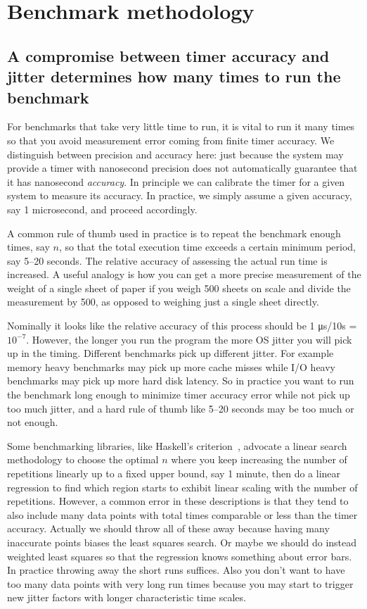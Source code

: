 \documentclass[conference]{IEEEtran}
\begin{document}
\section{Benchmark methodology}


\label{sec:linearsearch}
\subsection{A compromise between timer accuracy and jitter determines how many times to run the benchmark}

For benchmarks that take very little time to run, it is vital to run it many times so that you avoid measurement error coming from finite timer accuracy. We distinguish between precision and accuracy here: just because the system may provide a timer with nanosecond precision does not automatically guarantee that it has nanosecond \textit{accuracy}. In principle we can calibrate the timer for a given system to measure its accuracy. In practice, we simply assume a given accuracy, say 1 microsecond, and proceed accordingly.

A common rule of thumb used in practice is to repeat the benchmark enough times, say $n$, so that the total execution time exceeds a certain minimum period, say 5--20 seconds. The relative accuracy of assessing the actual run time is increased. A useful analogy is how you can get a more precise measurement of the weight of a single sheet of paper if you weigh 500 sheets on scale and divide the measurement by 500, as opposed to weighing just a single sheet directly.

Nominally it looks like the relative accuracy of this process should be 1 μs/10s = $10^{-7}$. However, the longer you run the program the more OS jitter you will pick up in the timing. Different benchmarks pick up different jitter. For example memory heavy benchmarks may pick up more cache misses while I/O heavy benchmarks may pick up more hard disk latency. So in practice you want to run the benchmark long enough to minimize timer accuracy error while not pick up too much jitter, and a hard rule of thumb like 5--20 seconds may be too much or not enough.

Some benchmarking libraries, like Haskell's criterion~\cite{criterion},
advocate a linear search methodology to choose the optimal $n$ where you keep increasing the number of repetitions linearly up to a fixed upper bound, say 1 minute, then do a linear regression to find which region starts to exhibit linear scaling with the number of repetitions. However, a common error in these descriptions is that they tend to also include many data points with total times comparable or less than the timer accuracy. Actually we should throw all of these away because having many inaccurate points biases the least squares search. Or maybe we should do instead weighted least squares so that the regression knows something about error bars. In practice throwing away the short runs suffices. Also you don't want to have too many data points with very long run times because you may start to trigger new jitter factors with longer characteristic time scales.
\end{document}
